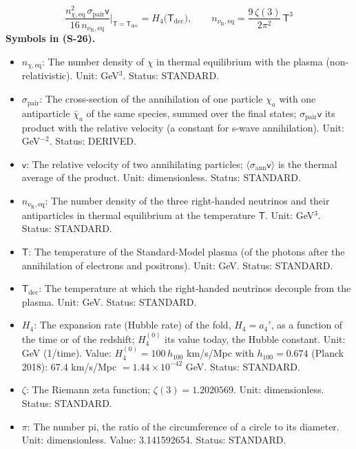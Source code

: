 \documentclass[
  10pt,
]{article}
\providecommand{\tightlist}{%
  \setlength{\itemsep}{0pt}\setlength{\parskip}{0pt}}
\begin{document}
\[
\frac{n_{\chi,\mathrm{eq}}^2\,\sigma_{\mathrm{pair}}\mathsf{v}}{16\,n_{\nu_{\mathrm{R}},\mathrm{eq}}}\Big\vert_{\mathsf{T} = \mathsf{T}_{\mathrm{dec}}}
= H_4\big(\mathsf{T}_{\mathrm{dec}}\big),\qquad n_{\nu_{\mathrm{R}},\mathrm{eq}} = \frac{9\,\zeta(3)}{2\pi^2}\,\mathsf{T}^3 \tag{S-26}
\] \textbf{Symbols in (S-26).}

\begin{itemize}
\tightlist
\item
  \(n_{\chi,\mathrm{eq}}\): The number density of \(\chi\) in thermal
  equilibrium with the plasma (non-relativistic). Unit: GeV\(^3\).
  Status: STANDARD.
\item
  \(\sigma_{\mathrm{pair}}\): The cross-section of the annihilation of
  one particle \(\chi_a\) with one antiparticle \(\bar\chi_a\) of the
  same species, summed over the final states;
  \(\sigma_{\mathrm{pair}}\mathsf{v}\) its product with the relative
  velocity (a constant for s-wave annihilation). Unit: GeV\(^{-2}\).
  Status: DERIVED.
\item
  \(\mathsf{v}\): The relative velocity of two annihilating particles;
  \(\langle\sigma_{\mathrm{ann}}\mathsf{v}\rangle\) is the thermal
  average of the product. Unit: dimensionless. Status: STANDARD.
\item
  \(n_{\nu_{\mathrm{R}},\mathrm{eq}}\): The number density of the three
  right-handed neutrinos and their antiparticles in thermal equilibrium
  at the temperature \(\mathsf{T}\). Unit: GeV\(^3\). Status: STANDARD.
\item
  \(\mathsf{T}\): The temperature of the Standard-Model plasma (of the
  photons after the annihilation of electrons and positrons). Unit: GeV.
  Status: STANDARD.
\item
  \(\mathsf{T}_{\mathrm{dec}}\): The temperature at which the
  right-handed neutrinos decouple from the plasma. Unit: GeV. Status:
  STANDARD.
\item
  \(H_4\): The expansion rate (Hubble rate) of the fold, \(H_4 = a_4'\),
  as a function of the time or of the redshift; \(H_4^{(0)}\) its value
  today, the Hubble constant. Unit: GeV (1/time). Value:
  \(H_4^{(0)} = 100\,h_{100}\) km/s/Mpc with \(h_{100} = 0.674\) (Planck
  2018): 67.4 km/s/Mpc \(= 1.44\times10^{-42}\) GeV. Status: STANDARD.
\item
  \(\zeta\): The Riemann zeta function; \(\zeta(3) = 1.2020569\). Unit:
  dimensionless. Status: STANDARD.
\item
  \(\pi\): The number pi, the ratio of the circumference of a circle to
  its diameter. Unit: dimensionless. Value: 3.141592654. Status:
  STANDARD.
\end{itemize}
\end{document}
